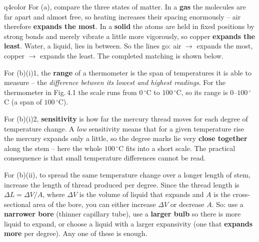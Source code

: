 \documentclass[11pt,a4paper]{article}
\begin{document}
\begin{ansbox}{q4color}
For (a), compare the three states of matter. In a \textbf{gas} the molecules are far apart and almost free, so heating increases their spacing enormously -- air therefore \textbf{expands the most}. In a \textbf{solid} the atoms are held in fixed positions by strong bonds and merely vibrate a little more vigorously, so copper \textbf{expands the least}. Water, a liquid, lies in between. So the lines go: air $\to$ expands the most, copper $\to$ expands the least. The completed matching is shown below.
\begin{center}
\end{center}

For (b)(i)1, the \textbf{range} of a thermometer is the span of temperatures it is able to measure -- the \emph{difference between its lowest and highest readings}. For the thermometer in Fig.\,4.1 the scale runs from $0\,^{\circ}$C to $100\,^{\circ}$C, so its range is $0$--$100\,^{\circ}$C (a span of $100\,^{\circ}$C).

For (b)(i)2, \textbf{sensitivity} is how far the mercury thread moves for each degree of temperature change. A \emph{low} sensitivity means that for a given temperature rise the mercury expands only a little, so the degree marks lie very \textbf{close together} along the stem -- here the whole $100\,^{\circ}$C fits into a short scale. The practical consequence is that small temperature differences cannot be read.

For (b)(ii), to spread the same temperature change over a longer length of stem, increase the length of thread produced per degree. Since the thread length is $\Delta L = \Delta V / A$, where $\Delta V$ is the volume of liquid that expands and $A$ is the cross-sectional area of the bore, you can either increase $\Delta V$ or decrease $A$. So: use a \textbf{narrower bore} (thinner capillary tube), use a \textbf{larger bulb} so there is more liquid to expand, or choose a liquid with a larger expansivity (one that \textbf{expands more} per degree). Any one of these is enough.
\end{ansbox}
\end{document}
